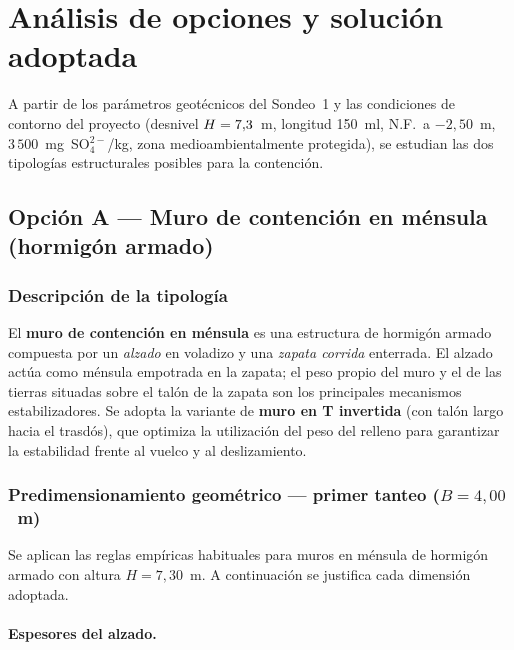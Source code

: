\section{Análisis de opciones y solución adoptada}
\label{sec:muro_opciones}

A partir de los parámetros geotécnicos del Sondeo~1 y las condiciones
de contorno del proyecto (desnivel $H = 7{,}3$~m, longitud
150~ml, N.F.\ a $-2{,}50$~m, $3\,500$~mg~SO$_4^{2-}$/kg, zona
medioambientalmente protegida), se estudian las dos tipologías estructurales
posibles para la contención.

\subsection{Opción A — Muro de contención en ménsula (hormigón armado)}
\label{subsec:opcion_mensula}

\subsubsection{Descripción de la tipología}

El \textbf{muro de contención en ménsula} es una estructura de hormigón
armado compuesta por un \emph{alzado} en voladizo y una \emph{zapata corrida}
enterrada. El alzado actúa como ménsula empotrada en la zapata; el peso propio
del muro y el de las tierras situadas sobre el talón de la zapata son los
principales mecanismos estabilizadores. Se adopta la variante de \textbf{muro
en T invertida} (con talón largo hacia el trasdós), que optimiza la
utilización del peso del relleno para garantizar la estabilidad frente al
vuelco y al deslizamiento.

\subsubsection{Predimensionamiento geométrico — primer tanteo ($B = 4{,}00$~m)}
\label{subsubsec:predim_4m}

Se aplican las reglas empíricas habituales para muros en ménsula de hormigón
armado con altura $H = 7{,}30$~m. A continuación se justifica cada dimensión adoptada.

\paragraph{Espesores del alzado.}

